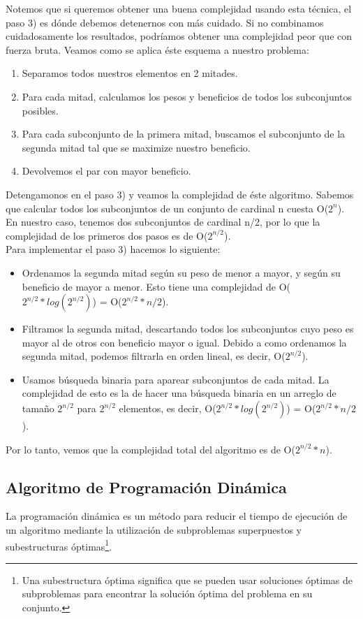 Notemos que si queremos obtener una buena complejidad usando esta técnica, el paso 3) es dónde debemos detenernos con más cuidado. Si no combinamos cuidadosamente los resultados, podríamos obtener una complejidad peor que con fuerza bruta.
Veamos como se aplica éste esquema a nuestro problema:

\begin{enumerate}
\item Separamos todos nuestros elementos en 2 mitades.
\item Para cada mitad, calculamos los pesos y beneficios de todos los subconjuntos posibles.
\item Para cada subconjunto de la primera mitad, buscamos el subconjunto de la segunda mitad tal que se maximize nuestro beneficio.
\item Devolvemos el par con mayor beneficio.
\end{enumerate}

Detengamonos en el paso 3) y veamos la complejidad de éste algoritmo. Sabemos que calcular todos los subconjuntos de un conjunto de cardinal n cuesta O($2^{n}$). En nuestro caso, tenemos dos subconjuntos de cardinal n/2, por lo que la complejidad de los primeros dos pasos es de O($2^{n/2}$). \\
Para implementar el paso 3) hacemos lo siguiente:
\begin{itemize}
\item Ordenamos la segunda mitad según su peso de menor a mayor, y según su beneficio de mayor a menor. Esto tiene una complejidad de O($2^{n/2} * log(2^{n/2})$) = O($2^{n/2} * n/2$).
\item Filtramos la segunda mitad, descartando todos los subconjuntos cuyo peso es mayor al de otros con beneficio mayor o igual. Debido a como ordenamos la segunda mitad, podemos filtrarla en orden lineal, es decir, O($2^{n/2}$).
\item Usamos búsqueda binaria para aparear subconjuntos de cada mitad. La complejidad de esto es la de hacer una búsqueda binaria en un arreglo de tamaño $2^{n/2}$ para $2^{n/2}$ elementos, es decir, O($2^{n/2} * log(2^{n/2})$) = O($2^{n/2} * n/2$).
\end{itemize}

\bigskip

Por lo tanto, vemos que la complejidad total del algoritmo es de O($2^{n/2} * n$).

\subsection{Algoritmo de Programación Dinámica}
La programación dinámica es un método para reducir el tiempo de ejecución de un algoritmo mediante la utilización de subproblemas superpuestos y subestructuras óptimas\footnote{Una subestructura óptima significa que se pueden usar soluciones óptimas de subproblemas para encontrar la solución óptima del problema en su conjunto.}.
 

